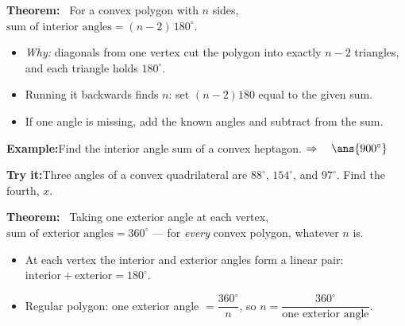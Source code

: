 \documentclass[12pt]{article}
\begin{document}


\begin{formulabox}
\textbf{Theorem:} \ For a convex polygon with $n$ sides,
\ $\text{sum of interior angles} = (n - 2)\,180^\circ$.
\begin{itemize}[leftmargin=0.8cm, itemsep=1pt, topsep=2pt]
  \item \emph{Why:} diagonals from one vertex cut the polygon into exactly
        $n - 2$ triangles, and each triangle holds $180^\circ$.
  \item Running it backwards finds $n$: set $(n - 2)180$ equal to the given sum.
  \item If one angle is missing, add the known angles and subtract from the sum.
\end{itemize}
\end{formulabox}

\begin{examplebox}
\textbf{Example:}\quad Find the interior angle sum of a convex heptagon.
$\Rightarrow\quad \ans{900^\circ}$
\end{examplebox}

\begin{tryitbox}
\textbf{Try it:}\quad Three angles of a convex quadrilateral are $88^\circ$,
$154^\circ$, and $97^\circ$. Find the fourth, $x$.\\[2pt]
\end{tryitbox}


\begin{formulabox}
\textbf{Theorem:} \ Taking one exterior angle at each vertex,
\ $\text{sum of exterior angles} = 360^\circ$ --- for \emph{every} convex polygon,
whatever $n$ is.
\begin{itemize}[leftmargin=0.8cm, itemsep=1pt, topsep=2pt]
  \item At each vertex the interior and exterior angles form a linear pair:
        $\text{interior} + \text{exterior} = 180^\circ$.
  \item Regular polygon: one exterior angle $= \dfrac{360^\circ}{n}$, so
        $n = \dfrac{360^\circ}{\text{one exterior angle}}$.
\end{itemize}
\end{formulabox}
\end{document}
